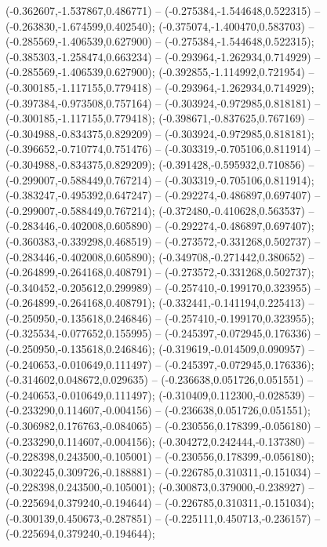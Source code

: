  (-0.362607,-1.537867,0.486771) -- (-0.275384,-1.544648,0.522315) -- (-0.263830,-1.674599,0.402540);
 (-0.375074,-1.400470,0.583703) -- (-0.285569,-1.406539,0.627900) -- (-0.275384,-1.544648,0.522315);
 (-0.385303,-1.258474,0.663234) -- (-0.293964,-1.262934,0.714929) -- (-0.285569,-1.406539,0.627900);
 (-0.392855,-1.114992,0.721954) -- (-0.300185,-1.117155,0.779418) -- (-0.293964,-1.262934,0.714929);
 (-0.397384,-0.973508,0.757164) -- (-0.303924,-0.972985,0.818181) -- (-0.300185,-1.117155,0.779418);
 (-0.398671,-0.837625,0.767169) -- (-0.304988,-0.834375,0.829209) -- (-0.303924,-0.972985,0.818181);
 (-0.396652,-0.710774,0.751476) -- (-0.303319,-0.705106,0.811914) -- (-0.304988,-0.834375,0.829209);
 (-0.391428,-0.595932,0.710856) -- (-0.299007,-0.588449,0.767214) -- (-0.303319,-0.705106,0.811914);
 (-0.383247,-0.495392,0.647247) -- (-0.292274,-0.486897,0.697407) -- (-0.299007,-0.588449,0.767214);
 (-0.372480,-0.410628,0.563537) -- (-0.283446,-0.402008,0.605890) -- (-0.292274,-0.486897,0.697407);
 (-0.360383,-0.339298,0.468519) -- (-0.273572,-0.331268,0.502737) -- (-0.283446,-0.402008,0.605890);
 (-0.349708,-0.271442,0.380652) -- (-0.264899,-0.264168,0.408791) -- (-0.273572,-0.331268,0.502737);
 (-0.340452,-0.205612,0.299989) -- (-0.257410,-0.199170,0.323955) -- (-0.264899,-0.264168,0.408791);
 (-0.332441,-0.141194,0.225413) -- (-0.250950,-0.135618,0.246846) -- (-0.257410,-0.199170,0.323955);
 (-0.325534,-0.077652,0.155995) -- (-0.245397,-0.072945,0.176336) -- (-0.250950,-0.135618,0.246846);
 (-0.319619,-0.014509,0.090957) -- (-0.240653,-0.010649,0.111497) -- (-0.245397,-0.072945,0.176336);
 (-0.314602,0.048672,0.029635) -- (-0.236638,0.051726,0.051551) -- (-0.240653,-0.010649,0.111497);
 (-0.310409,0.112300,-0.028539) -- (-0.233290,0.114607,-0.004156) -- (-0.236638,0.051726,0.051551);
 (-0.306982,0.176763,-0.084065) -- (-0.230556,0.178399,-0.056180) -- (-0.233290,0.114607,-0.004156);
 (-0.304272,0.242444,-0.137380) -- (-0.228398,0.243500,-0.105001) -- (-0.230556,0.178399,-0.056180);
 (-0.302245,0.309726,-0.188881) -- (-0.226785,0.310311,-0.151034) -- (-0.228398,0.243500,-0.105001);
 (-0.300873,0.379000,-0.238927) -- (-0.225694,0.379240,-0.194644) -- (-0.226785,0.310311,-0.151034);
 (-0.300139,0.450673,-0.287851) -- (-0.225111,0.450713,-0.236157) -- (-0.225694,0.379240,-0.194644);
